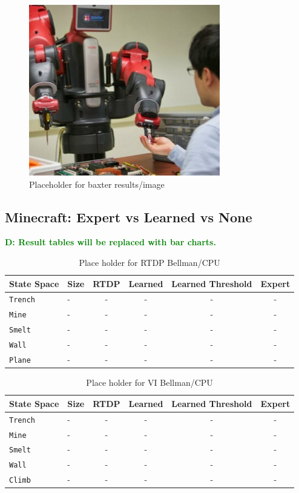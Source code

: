 \documentclass[conference]{IEEEtran}
\newcommand{\dnote}[1]{\textcolor{Green}{\textbf{D: #1}}}
\begin{document}
\begin{figure}[H]
\centering
\includegraphics[scale=0.195]{figures/baxter_temp.jpg}%
  \caption{Placeholder for baxter results/image}
  \label{fig:baxter_results}
\end{figure}

\subsection{Minecraft: Expert vs Learned vs None}

\dnote{Result tables will be replaced with bar charts.}

\begin{table}[H]
\centering
\begin{tabular}{ l  l || c c c c }
  State Space 		&	Size 	&	RTDP 	& Learned 	& Learned Threshold & Expert 	\\ \hline
  \texttt{Trench}  	& 	-	&	-	&	-		&	-	&	-	\\
  \texttt{Mine}  		& 	-	&	-	&	-		&	-   	&	-	\\
  \texttt{Smelt}  		& 	-	&	-	&	-		&	-	&	-	\\
  \texttt{Wall}  		& 	-	&	-	&	-		&	-	&	-	\\
  \texttt{Plane}  		& 	-	&	-	&	-		&	- 	&	-	\\
\end{tabular}
\caption{Place holder for RTDP Bellman/CPU}
\label{table:minecraft_results_bellman}
\end{table}

\begin{table}[H]
\centering
\begin{tabular}{ l l || c c c c }
  State Space 		&	Size 	&	RTDP 	& Learned & Learned Threshold & Expert 	\\ \hline
  \texttt{Trench}  	& 	-	&	-		&	-	&	-			&	-	\\
  \texttt{Mine}  		& 	-	&	-		&	-	&	-  			&	-	\\
  \texttt{Smelt}  		& 	-	&	-		&	-	&	-  			&	-	\\
  \texttt{Wall}  		& 	-	&	-		&	-	&	-			&	-	\\
  \texttt{Climb}  		& 	-	&	-		&	-	&	- 			&	-	\\
\end{tabular}
\caption{Place holder for VI Bellman/CPU}
\label{table:minecraft_results_bellman}
\end{table}
\end{document}
